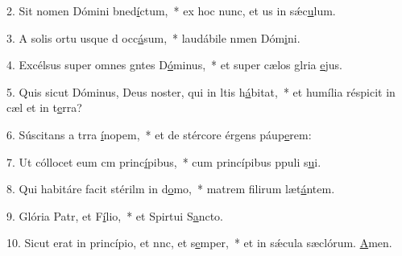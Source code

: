 2. Sit nomen Dómini bned\uline{í}ctum,~* ex hoc nunc, et us in sǽc\uline{u}lum.\par 
3. A solis ortu usque d occ\uline{á}sum,~* laudábile nmen Dóm\uline{i}ni.\par 
4. Excélsus super omnes gntes D\uline{ó}minus,~* et super cælos glria \uline{e}jus.\par 
5. Quis sicut Dóminus, Deus noster, qui in ltis h\uline{á}bitat,~* et humília réspicit in cæl et in t\uline{e}rra?\par 
6. Súscitans a trra \uline{í}nopem,~* et de stércore érgens páup\uline{e}rem:\par 
7. Ut cóllocet eum cm princ\uline{í}pibus,~* cum princípibus ppuli s\uline{u}i.\par 
8. Qui habitáre facit stérilm in d\uline{o}mo,~* matrem filirum læt\uline{á}ntem.\par 
9. Glória Patr, et F\uline{í}lio,~* et Spirtui S\uline{a}ncto.\par 
10. Sicut erat in princípio, et nnc, et s\uline{e}mper,~* et in sǽcula sæclórum. \uline{A}men.\par 
